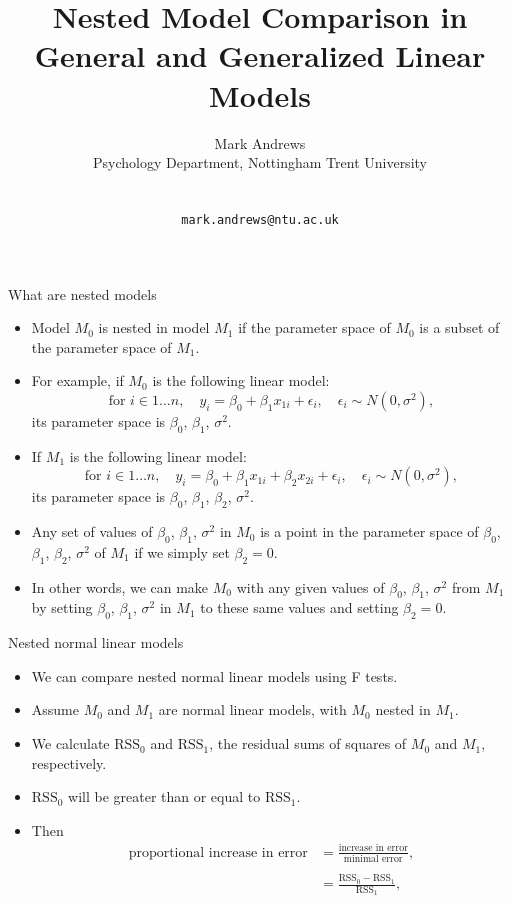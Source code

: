 \documentclass[
  10pt,
  ignorenonframetext,
]{beamer}
\title{Nested Model Comparison in General and Generalized Linear Models}
\author{Mark Andrews\\
Psychology Department, Nottingham Trent University\\
\strut \\
\texttt{mark.andrews@ntu.ac.uk}}
\date{}
\providecommand{\tightlist}{%
  \setlength{\itemsep}{0pt}\setlength{\parskip}{0pt}}
\begin{document}
\frame{\titlepage}

\begin{frame}{What are nested models}
\protect\hypertarget{what-are-nested-models}{}
\begin{itemize}
\tightlist
\item
  Model \(M_0\) is nested in model \(M_1\) if the parameter space of
  \(M_0\) is a subset of the parameter space of \(M_1\).
\item
  For example, if \(M_0\) is the following linear model: \[
  \text{for $i \in 1\ldots n,$} \quad y_i = \beta_0 + \beta_1 x_{1i} + \epsilon_i,\quad \epsilon_i \sim N(0, \sigma^2),
  \] its parameter space is \(\beta_0\), \(\beta_1\), \(\sigma^2\).
\item
  If \(M_1\) is the following linear model: \[
  \text{for $i \in 1\ldots n,$} \quad y_i = \beta_0 + \beta_1 x_{1i} + \beta_2 x_{2i} + \epsilon_i,\quad \epsilon_i \sim N(0, \sigma^2),
  \] its parameter space is \(\beta_0\), \(\beta_1\), \(\beta_2\),
  \(\sigma^2\).
\item
  Any set of values of \(\beta_0\), \(\beta_1\), \(\sigma^2\) in \(M_0\)
  is a point in the parameter space of \(\beta_0\), \(\beta_1\),
  \(\beta_2\), \(\sigma^2\) of \(M_1\) if we simply set \(\beta_2 = 0\).
\item
  In other words, we can make \(M_0\) with any given values of
  \(\beta_0\), \(\beta_1\), \(\sigma^2\) from \(M_1\) by setting
  \(\beta_0\), \(\beta_1\), \(\sigma^2\) in \(M_1\) to these same values
  and setting \(\beta_2 = 0\).
\end{itemize}
\end{frame}

\begin{frame}{Nested normal linear models}
\protect\hypertarget{nested-normal-linear-models}{}
\begin{itemize}
\tightlist
\item
  We can compare nested normal linear models using F tests.
\item
  Assume \(M_0\) and \(M_1\) are normal linear models, with \(M_0\)
  nested in \(M_1\).
\item
  We calculate \(\text{RSS}_0\) and \(\text{RSS}_1\), the residual sums
  of squares of \(M_0\) and \(M_1\), respectively.
\item
  \(\text{RSS}_0\) will be greater than or equal to \(\text{RSS}_1\).
\item
  Then \[
  \begin{aligned}
  \text{proportional increase in error}&= \frac{\text{increase in error}}{\text{minimal error}} ,\\
  \\
  &= \frac{\text{RSS}_0 - \text{RSS}_1}{\text{RSS}_1},
  \end{aligned}
  \]
\end{itemize}
\end{frame}
\end{document}
